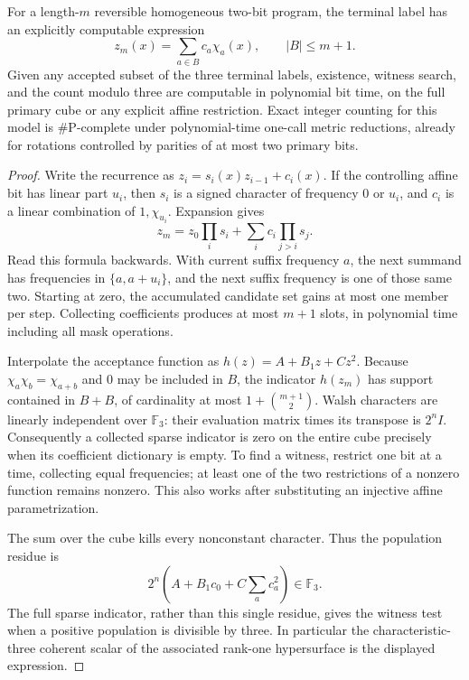 \begin{theorem}
\label{st:register}
For a length-$m$ reversible homogeneous two-bit program, the terminal label has an explicitly computable expression
\[
 z_m(x)=\sum_{a\in B}c_a\chi_a(x),\qquad |B|\le m+1.
\]
Given any accepted subset of the three terminal labels, existence, witness search, and the count modulo three are computable in polynomial bit time, on the full primary cube or any explicit affine restriction. Exact integer counting for this model is $\#\mathrm P$-complete under polynomial-time one-call metric reductions, already for rotations controlled by parities of at most two primary bits.
\end{theorem}
\begin{proof}
Write the recurrence as $z_i=s_i(x)z_{i-1}+c_i(x)$. If the controlling affine bit has linear part $u_i$, then $s_i$ is a signed character of frequency $0$ or $u_i$, and $c_i$ is a linear combination of $1,\chi_{u_i}$. Expansion gives
\[
 z_m=z_0\prod_i s_i+\sum_i c_i\prod_{j>i}s_j.
\]
Read this formula backwards. With current suffix frequency $a$, the next summand has frequencies in $\{a,a+u_i\}$, and the next suffix frequency is one of those same two. Starting at zero, the accumulated candidate set gains at most one member per step. Collecting coefficients produces at most $m+1$ slots, in polynomial time including all mask operations.

Interpolate the acceptance function as $h(z)=A+B_1z+Cz^2$. Because $\chi_a\chi_b=\chi_{a+b}$ and $0$ may be included in $B$, the indicator $h(z_m)$ has support contained in $B+B$, of cardinality at most $1+\binom{m+1}{2}$. Walsh characters are linearly independent over $\mathbb F_3$: their evaluation matrix times its transpose is $2^nI$. Consequently a collected sparse indicator is zero on the entire cube precisely when its coefficient dictionary is empty. To find a witness, restrict one bit at a time, collecting equal frequencies; at least one of the two restrictions of a nonzero function remains nonzero. This also works after substituting an injective affine parametrization.

The sum over the cube kills every nonconstant character. Thus the population residue is
\begin{equation}
\label{st:eq:register-count}
 2^n\left(A+B_1c_0+C\sum_a c_a^2\right)\in\mathbb F_3.
\end{equation}
The full sparse indicator, rather than this single residue, gives the witness test when a positive population is divisible by three. In particular the characteristic-three coherent scalar of the associated rank-one hypersurface is the displayed expression.


\end{proof}
